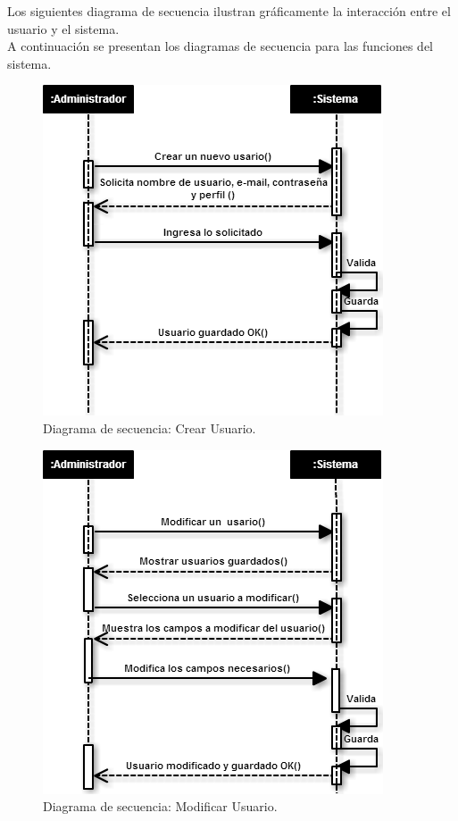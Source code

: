 Los siguientes diagrama de secuencia ilustran gráficamente la interacción entre el usuario y el sistema. \\
A continuación se presentan los diagramas de secuencia para las funciones del sistema.

\begin{figure}[htb]
	\label{dss1}
	\begin{center}
		\includegraphics[scale=0.5]{imagenes/creauser2.png}
	\end{center}
	\caption{Diagrama de secuencia: Crear Usuario.}
\end{figure}


\begin{figure}[htb]
	\label{dss2}
	\begin{center}
		\includegraphics[scale=0.5]{imagenes/modificaruser.png}
	\end{center}
	\caption{Diagrama de secuencia: Modificar Usuario.}
\end{figure}


